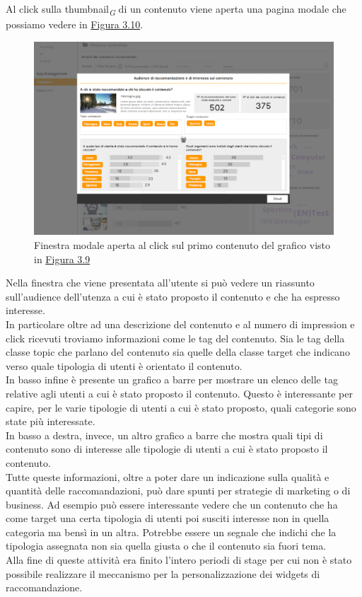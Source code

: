 \documentclass[a4paper, 12pt, twoside, openright]{book}
\newcommand{\gloss}[1]{#1\textsubscript{\textit{\tiny{G}}}}
\begin{document}
Al click sulla \gloss{thumbnail} di un contenuto viene aperta una pagina modale che possiamo vedere in \hyperref[grafico-qualitativo-2]{Figura 3.10}. 
\begin{figure}[H]
	\centering
	\label{grafico-qualitativo-2}
	\includegraphics[width=1.0\textwidth]{images/grafico-qualitativo-2.jpg}
	\caption{Finestra modale aperta al click sul primo contenuto del grafico visto in \hyperref[grafico-qualitativo-1]{Figura 3.9}}
\end{figure}
Nella finestra che viene presentata all'utente si può vedere un riassunto sull'audience dell'utenza a cui è stato proposto il contenuto e che ha espresso interesse.\\
In particolare oltre ad una descrizione del contenuto e al numero di impression e click ricevuti troviamo informazioni come le tag del contenuto. Sia le tag della classe topic che parlano del contenuto sia quelle della classe target che indicano verso quale tipologia di utenti è orientato il contenuto.\\
In basso infine è presente un grafico a barre per mostrare un elenco delle tag relative agli utenti a cui è stato proposto il contenuto. Questo è interessante per capire, per le varie tipologie di utenti a cui è stato proposto, quali categorie sono state più interessate.\\
In basso a destra, invece, un altro grafico a barre che mostra quali tipi di contenuto sono di interesse alle tipologie di utenti a cui è stato proposto il contenuto.\\
Tutte queste informazioni, oltre a poter dare un indicazione sulla qualità e quantità delle raccomandazioni, può dare spunti per strategie di marketing o di business. Ad esempio può essere interessante vedere che un contenuto che ha come target una certa tipologia di utenti poi susciti interesse non in quella categoria ma bensì in un altra. Potrebbe essere un segnale che indichi che la tipologia assegnata non sia quella giusta o che il contenuto sia fuori tema.\\
Alla fine di queste attività era finito l'intero periodi di stage per cui non è stato possibile realizzare il meccanismo per la personalizzazione dei widgets di raccomandazione.
\end{document}
